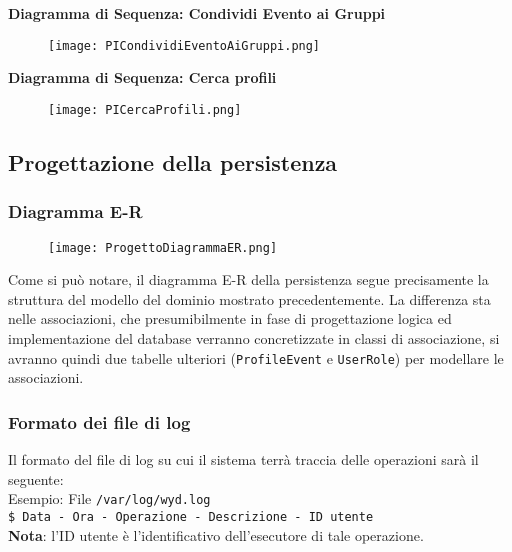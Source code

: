 \textbf{Diagramma di Sequenza: Condividi Evento ai Gruppi}
\begin{figure}[h!]
    \centering
    \texttt{[image: PICondividiEventoAiGruppi.png]}
\end{figure}

\textbf{Diagramma di Sequenza: Cerca profili}
\begin{figure}[h!]
    \centering
    \texttt{[image: PICercaProfili.png]}
\end{figure}


\clearpage


\subsection{Progettazione della persistenza}

\subsubsection{Diagramma E-R}

\begin{figure}[h!]
    \begin{center}
        \texttt{[image: ProgettoDiagrammaER.png]}
    \end{center}
\end{figure}

Come si può notare, il diagramma E-R della persistenza segue precisamente la struttura del modello del dominio mostrato precedentemente.
La differenza sta nelle associazioni, che presumibilmente in fase di progettazione logica ed implementazione del database verranno concretizzate in classi di associazione,
si avranno quindi due tabelle ulteriori (\texttt{ProfileEvent} e \texttt{UserRole}) per modellare le associazioni.

\subsubsection{Formato dei file di log}

Il formato del file di log su cui il sistema terrà traccia delle operazioni
sarà il seguente:\\

Esempio: File \texttt{/var/log/wyd.log}\\

\texttt{\$ Data - Ora - Operazione - Descrizione - ID utente}\\
\textbf{Nota}: l'ID utente è l'identificativo dell'esecutore di tale operazione.
\newpage

